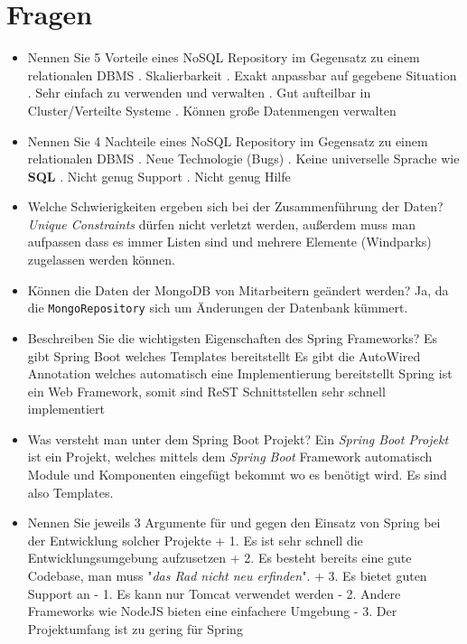 \clearpage
\section{Fragen}

\begin{itemize}
    \item Nennen Sie 5 Vorteile eines NoSQL Repository im Gegensatz zu einem relationalen DBMS
        . Skalierbarkeit
        . Exakt anpassbar auf gegebene Situation
        . Sehr einfach zu verwenden und verwalten
        . Gut aufteilbar in Cluster/Verteilte Systeme
        . Können große Datenmengen verwalten
    \item Nennen Sie 4 Nachteile eines NoSQL Repository im Gegensatz zu einem relationalen DBMS
        . Neue Technologie (Bugs)
        . Keine universelle Sprache wie \textbf{SQL}
        . Nicht genug Support
        . Nicht genug Hilfe
    \item Welche Schwierigkeiten ergeben sich bei der Zusammenführung der Daten?
        \subitem \textit{Unique Constraints} dürfen nicht verletzt werden, außerdem muss man aufpassen dass es immer Listen sind und mehrere Elemente (Windparks) zugelassen werden können.
    \item Können die Daten der MongoDB von Mitarbeitern geändert werden?
        \subitem Ja, da die \texttt{MongoRepository} sich um Änderungen der Datenbank kümmert.
    \item Beschreiben Sie die wichtigsten Eigenschaften des Spring Frameworks?
        \subitem Es gibt Spring Boot welches Templates bereitstellt
        \subitem Es gibt die AutoWired Annotation welches automatisch eine Implementierung bereitstellt
        \subitem Spring ist ein Web Framework, somit sind ReST Schnittstellen sehr schnell implementiert
    \item Was versteht man unter dem Spring Boot Projekt?
        \subitem Ein \textit{Spring Boot Projekt} ist ein Projekt, welches mittels dem \textit{Spring Boot} Framework automatisch Module und Komponenten eingefügt bekommt wo es benötigt wird. Es sind also Templates.
    \item Nennen Sie jeweils 3 Argumente für und gegen den Einsatz von Spring bei der Entwicklung solcher Projekte
        \subitem + 1. Es ist sehr schnell die Entwicklungsumgebung aufzusetzen
        \subitem + 2. Es besteht bereits eine gute Codebase, man muss "\textit{das Rad nicht neu erfinden}".
        \subitem + 3. Es bietet guten Support an
        \subitem - 1. Es kann nur Tomcat verwendet werden
        \subitem - 2. Andere Frameworks wie NodeJS bieten eine einfachere Umgebung
        \subitem - 3. Der Projektumfang ist zu gering für Spring
\end{itemize}
